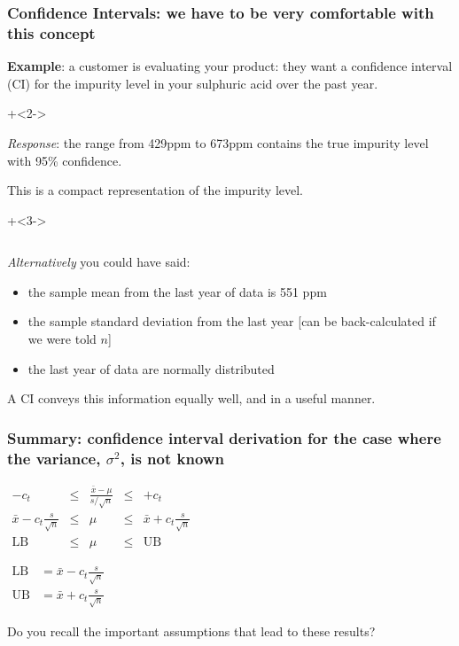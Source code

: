 \begin{frame}\frametitle{Confidence Intervals: we have to be \textbf{very} comfortable with this concept}

	\textbf{Example}: a customer is evaluating your product: they want a confidence interval (CI) for the impurity level in your sulphuric acid over the past year.

	\vspace{12pt}

	\onslide+<2->{
	{\color{myOrange}\emph{Response}}: the range from 429ppm to 673ppm contains the true impurity level with 95\% confidence.
	
	\vspace{12pt}

	This is a compact representation of the impurity level.
	}
	
	\onslide+<3->{
	$\qquad$

	\emph{Alternatively} you could have said:
	\begin{itemize}
		\item	the sample mean from the last year of data is 551 ppm
		\item	the sample standard deviation from the last year [can be back-calculated if we were told $n$]
		\item	the last year of data are normally distributed
	\end{itemize}

	A CI conveys this information equally well, and in a useful manner.
	}
\end{frame}

\begin{frame}\frametitle{Summary: confidence interval derivation for the case where the variance, $\sigma^2$, is not known}


	$
	\begin{array}{rcccl}
		- c_t &\leq& \displaystyle \frac{\bar{x} - \mu}{s/\sqrt{n}} &\leq& +c_t\\
		\bar{x} - c_t \displaystyle \frac{s}{\sqrt{n}} &\leq& \mu &\leq& \bar{x} + c_t\displaystyle\frac{s}{\sqrt{n}} \\
		\text{LB} &\leq& \mu &\leq& \text{UB}
	\end{array}
	$
	
	\vspace{20pt}
	$
	\begin{array}{rcl}
		\text{LB} &= \bar{x} - c_t \displaystyle \frac{s}{\sqrt{n}}\\
		\text{UB} &= \bar{x} + c_t \displaystyle \frac{s}{\sqrt{n}}
	\end{array}
	$
	
	\vspace{20pt}
	Do you recall the important assumptions that lead to these results?
\end{frame}

